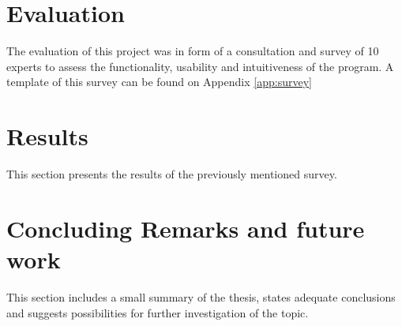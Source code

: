 \documentclass[12pt]{extarticle}
\begin{document}
\section{Evaluation} \label{sec:Eval}
The evaluation of this project was in form of a consultation and survey of 10 experts to assess the functionality, usability and intuitiveness of the program. A template of this survey can be found on Appendix \ref{app:survey}\cite{QDsus}

\section{Results}\label{sec:Res}
This section presents the results of the previously mentioned survey.

\section{Concluding Remarks and future work}\label{sec:Con}
This section includes a small summary of the thesis, states adequate conclusions and suggests possibilities for further investigation of the topic.


\pagebreak
\end{document}
